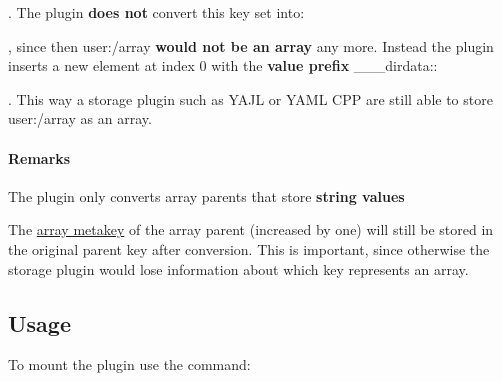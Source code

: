 

. The plugin {\bfseries does not} convert this key set into\+:




, since then {\ttfamily user\+:/array} {\bfseries would not be an array} any more. Instead the plugin inserts a new element at index 0 with the {\bfseries value prefix} {\ttfamily \+\_\+\+\_\+\+\_\+dirdata\+:}\+:




. This way a storage plugin such as Y\+A\+JL or Y\+A\+ML C\+PP are still able to store {\ttfamily user\+:/array} as an array.\hypertarget{autotoc_md173_autotoc_md176}{}\paragraph{Remarks}\label{autotoc_md173_autotoc_md176}

\begin{DoxyItemize}
\item The plugin only converts array parents that store {\bfseries string values}
\item The \hyperlink{doc_decisions_array_md}{array metakey} of the array parent (increased by one) will still be stored in the original parent key after conversion. This is important, since otherwise the storage plugin would lose information about which key represents an array.
\end{DoxyItemize}\hypertarget{autotoc_md173_autotoc_md177}{}\subsection{Usage}\label{autotoc_md173_autotoc_md177}
To mount the plugin use the command\+:


